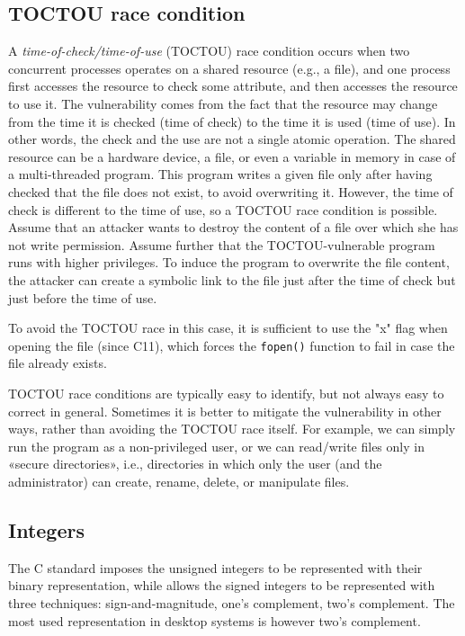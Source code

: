 \documentclass[a4paper,12pt]{article}
\begin{document}
\subsection{TOCTOU race condition}
A \textit{time-of-check/time-of-use} (TOCTOU) race condition occurs when two concurrent processes operates on a shared resource (e.g., a file), and one process first accesses the resource to check some attribute, and then accesses the resource to use it. The vulnerability comes from the fact that the resource may change from the time it is checked (time of check) to the time it is used (time of use). In other words, the check and the use are not a single atomic operation. The shared resource can be a hardware device, a file, or even a variable in memory in case of a multi-threaded program.
This program writes a given file only after having checked that the file does not exist, to avoid overwriting it. However, the time of check is different to the time of use, so a TOCTOU race condition is possible. Assume that an attacker wants to destroy the content of a file over which she has not write permission. Assume further that the TOCTOU-vulnerable program runs with higher privileges. To induce the program to overwrite the file content, the attacker can create a symbolic link to the file just after the time of check but just before the time of use.

To avoid the TOCTOU race in this case, it is sufficient to use the "x" flag when opening the file (since C11), which forces the \texttt{fopen()} function to fail in case the file already exists.

TOCTOU race conditions are typically easy to identify, but not always easy to correct in general. Sometimes it is better to mitigate the vulnerability in other ways, rather than avoiding the TOCTOU race itself. For example, we can simply run the program as a non-privileged user, or we can read/write files only in «secure directories», i.e., directories in which only the user (and the administrator) can create, rename, delete, or manipulate files.

\subsection{Integers}
The C standard imposes the unsigned integers to be represented with their binary representation, while allows the signed integers to be represented with three techniques: sign-and-magnitude, one’s complement, two’s complement. The most used representation in desktop systems is however two’s complement.
\end{document}
